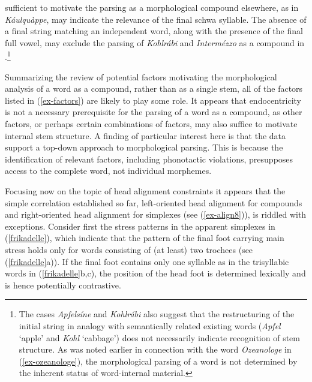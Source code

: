 \documentclass[output=paper
 ,nobabel
 ,draftmode
 ,colorlinks, citecolor=brown
]{langscibook}
\begin{document}
sufficient to motivate the parsing as a morphological compound elsewhere, as in \emph{Káulquàppe},
may indicate the relevance of the final schwa syllable. The absence of a final
string matching an independent word, along with the presence of the final full vowel, may exclude the
parsing of  \emph{Kohlrábi} and \emph{Intermézzo} as a compound in .\footnote{The cases
  \emph{Apfelsíne} and \emph{Kohlrábi} also suggest that the restructuring of the initial string in
  analogy with semantically related existing words (\eg \emph{Apfel} `apple' and \emph{Kohl}
  `cabbage') does not necessarily indicate recognition of stem structure. As was noted earlier in
  connection with the word \emph{Ozeanologe} in (\ref{ex-ozeanologe}), the morphological parsing of
  a word is not determined by the inherent status of word-internal material.} 

Summarizing the review of potential factors motivating the morphological analysis of a word as a compound, rather than as a single stem, all of the factors listed in (\ref{ex-factors}) are likely to play some role. It appears that endocentricity is not a necessary prerequisite for the parsing of a word as a compound, as other factors, or perhaps certain combinations of factors, may also suffice to motivate internal stem structure. A finding of particular interest here is that the data support a top-down approach to morphological parsing. This is because the identification of relevant factors, including phonotactic violations, presupposes access to the complete word, not individual morphemes. 

Focusing now on the topic of head alignment constraints it appears that the simple correlation
established so far, left-oriented head alignment for compounds and right-oriented head alignment for
simplexes (see (\ref{ex-align8})), is riddled with exceptions. Consider first the stress patterns in the apparent simplexes in (\ref{frikadelle}), which indicate that the pattern of the final foot carrying main stress holds only for words consisting of (at least) two trochees (see (\ref{frikadelle}a)). If the final foot contains only one syllable as in the trisyllabic words in (\ref{frikadelle}b,c), the position of the head foot is determined lexically and is hence potentially contrastive.
\end{document}
